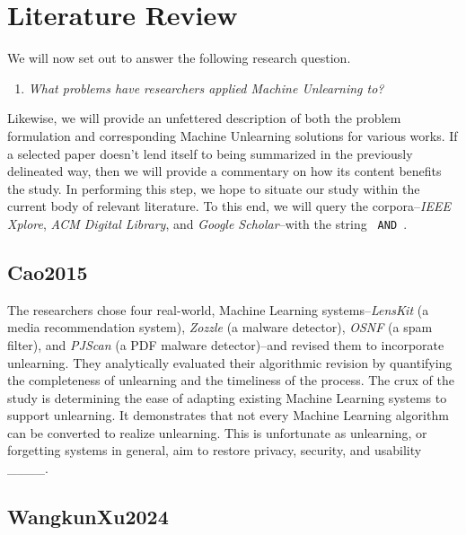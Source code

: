 \section{Literature Review}
\label{sec:Literature_Review}

    We will now set out to answer the following research question. 
    
    \begin{enumerate}[label=\textbf{RQ\arabic*}:, left=2em]
        \item \textit{What problems have researchers applied Machine Unlearning to?}
    \end{enumerate}
    
    Likewise, we will provide an unfettered description of both the problem formulation and corresponding Machine Unlearning solutions for various works. If a selected paper doesn't lend itself to being summarized in the previously delineated way, then we will provide a commentary on how its content benefits the study. In performing this step, we hope to situate our study within the current body of relevant literature. To this end, we will query the corpora--\textit{IEEE Xplore}, \textit{ACM Digital Library}, and \textit{Google Scholar}--with the string \texttt{ AND }.
    
    \subsection{Cao2015}
    \label{subsec:Cao2015}
    
        The researchers chose four real-world, Machine Learning systems--\textit{LensKit} (a media recommendation system), \textit{Zozzle} (a malware detector), \textit{OSNF} (a spam filter), and \textit{PJScan} (a PDF malware detector)--and revised them to incorporate unlearning. They analytically evaluated their algorithmic revision by quantifying the completeness of unlearning and the timeliness of the process. The crux of the study is determining the ease of adapting existing Machine Learning systems to support unlearning. It demonstrates that not every Machine Learning algorithm can be converted to realize unlearning. This is unfortunate as unlearning, or forgetting systems in general, aim to restore privacy, security, and usability ____.
    
    \subsection{WangkunXu2024}
    \label{subsec:WangkunXu2024}
    
